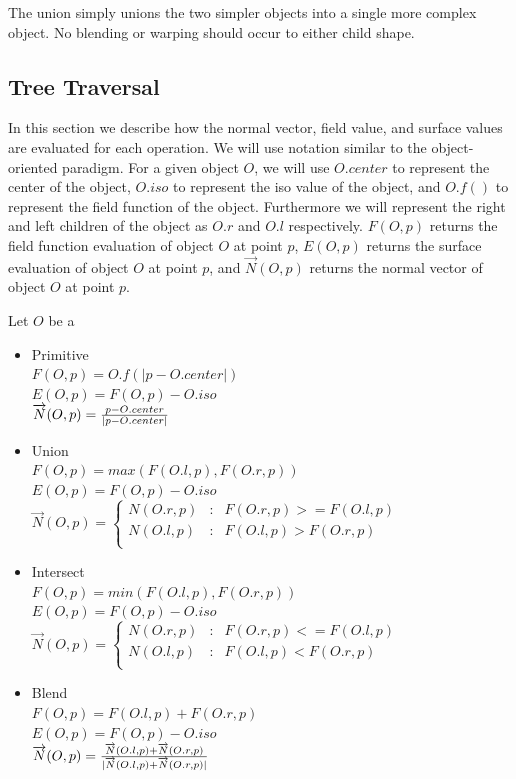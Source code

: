 \documentclass[conference]{acmsiggraph}
\begin{document}
The union simply unions the two simpler objects into a single more complex
object. No blending or warping should occur to either child shape.


\subsection{Tree Traversal}

In this section we describe how the normal vector, field value, and surface
values are evaluated for each operation.
We will use notation similar to the object-oriented paradigm. For a given
object $O$, we will use $O.center$ to represent the center of the object,
$O.iso$ to represent the iso value of the object, and $O.f()$ to represent the
field function of the object. Furthermore we will represent the right and left
children of the object as $O.r$ and $O.l$ respectively. $F(O, p)$ returns the
field function evaluation of object $O$ at point $p$, $E(O, p)$ returns the
surface evaluation of object $O$ at point $p$, and
$\overrightarrow{N}(O, p)$ returns the normal vector of object $O$ at point
$p$.

Let $O$ be a
\begin{itemize}
	\item Primitive\\
		$F(O, p) = O.f(\lvert p - O.center \rvert)$\\
		$E(O, p) = F(O, p) - O.iso$\\
		$\overrightarrow{N}(O, p) = {p - O.center \over \lvert p -
		O.center \rvert}$
	\item Union\\
		$F(O, p) = max(F(O.l, p), F(O.r, p))$\\
		$E(O, p) = F(O, p) - O.iso$\\
		$
		\overrightarrow{N}(O, p) = \left\{
			\begin{array}{lcl}
				N(O.r, p) & : &  F(O.r, p) >= F(O.l, p)\\
				N(O.l, p) & : &  F(O.l, p) >  F(O.r, p)\\
			\end{array}
		\right.
		$
	\item Intersect\\
		$F(O, p) = min(F(O.l, p), F(O.r, p))$\\
		$E(O, p) = F(O, p) - O.iso$\\
		$
		\overrightarrow{N}(O, p) = \left\{
			\begin{array}{lcl}
				N(O.r, p) & : &  F(O.r, p) <= F(O.l, p)\\
				N(O.l, p) & : &  F(O.l, p) <  F(O.r, p)\\
			\end{array}
		\right.
		$
	\item Blend\\
		$F(O, p) = F(O.l, p) + F(O.r, p)$\\
		$E(O, p) = F(O, p) - O.iso$\\
		$\overrightarrow{N}(O, p) = {\overrightarrow{N}(O.l, p) +
		\overrightarrow{N}(O.r, p) \over
		\lvert \overrightarrow{N}(O.l, p) + \overrightarrow{N}(O.r, p)
		\rvert}$\\
\end{itemize}
\end{document}

